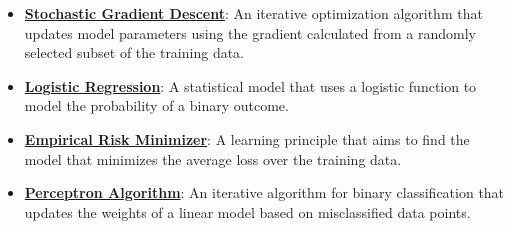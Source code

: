 \documentclass{article}%
\begin{document}
\begin{itemize}[leftmargin=*]
\item \href{https://purdue.brightspace.com/d2l/common/assets/pdfjs-d2l-dist/1.0.14-legacy/web/viewer.html?file=%2Fcontent%2Fenforced%2F1095467-wl.202510.CS.24300.001%2F05L2-ML Basics.pdf%3Fou%3D1095467&lang=en-us&container=d2l-fileviewer-rendered-pdf&fullscreen=d2l-fileviewer-rendered-pdf-dialog&height=667#page=29}{\textbf{Stochastic Gradient Descent}}: An iterative optimization algorithm that updates model parameters using the gradient calculated from a randomly selected subset of the training data.%
\item \href{https://purdue.brightspace.com/d2l/common/assets/pdfjs-d2l-dist/1.0.14-legacy/web/viewer.html?file=%2Fcontent%2Fenforced%2F1095467-wl.202510.CS.24300.001%2F05L2-ML Basics.pdf%3Fou%3D1095467&lang=en-us&container=d2l-fileviewer-rendered-pdf&fullscreen=d2l-fileviewer-rendered-pdf-dialog&height=667#page=31}{\textbf{Logistic Regression}}: A statistical model that uses a logistic function to model the probability of a binary outcome.%
\item \href{https://purdue.brightspace.com/d2l/common/assets/pdfjs-d2l-dist/1.0.14-legacy/web/viewer.html?file=%2Fcontent%2Fenforced%2F1095467-wl.202510.CS.24300.001%2F05L2-ML Basics.pdf%3Fou%3D1095467&lang=en-us&container=d2l-fileviewer-rendered-pdf&fullscreen=d2l-fileviewer-rendered-pdf-dialog&height=667#page=15}{\textbf{Empirical Risk Minimizer}}: A learning principle that aims to find the model that minimizes the average loss over the training data.%
\item \href{https://purdue.brightspace.com/d2l/common/assets/pdfjs-d2l-dist/1.0.14-legacy/web/viewer.html?file=%2Fcontent%2Fenforced%2F1095467-wl.202510.CS.24300.001%2F05L2-ML Basics.pdf%3Fou%3D1095467&lang=en-us&container=d2l-fileviewer-rendered-pdf&fullscreen=d2l-fileviewer-rendered-pdf-dialog&height=667#page=30}{\textbf{Perceptron Algorithm}}: An iterative algorithm for binary classification that updates the weights of a linear model based on misclassified data points.%
\end{itemize}

%
\end{document}
